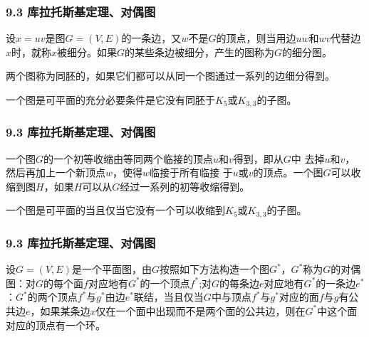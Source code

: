 \documentclass{beamer}
\begin{document}
\begin{CJK}{UTF8}{gbsn}
\begin{frame}
  \frametitle{9.3 库拉托斯基定理、对偶图}
  \begin{definition9.3.1}
    设$x=uv$是图$G=(V,E)$的一条边，又$w$不是$G$的顶点，则当用边$uw$和$wv$代替边$x$时，就称$x$被细分。如果$G$的某些条边被细分，产生的图称为$G$的细分图。
  \end{definition9.3.1}
  \begin{definition9.3.2}
    两个图称为同胚的，如果它们都可以从同一个图通过一系列的边细分得到。
  \end{definition9.3.2}
  \begin{theorem9.3.1}
    一个图是可平面的充分必要条件是它没有同胚于$K_5$或$K_{3,3}$的子图。
  \end{theorem9.3.1}
\end{frame}
\begin{frame}
  \frametitle{9.3 库拉托斯基定理、对偶图}
  \begin{definition9.3.3}
    一个图$G$的一个初等收缩由等同两个临接的顶点$u$和$v$得到，即从$G$中
    去掉$u$和$v$，然后再加上一个新顶点$w$，使得$w$临接于所有临接
    于$u$或$v$的顶点。一个图$G$可以收缩到图$H$，如果$H$可以从$G$经过一系列的初等收缩得到。
  \end{definition9.3.3}
  \begin{theorem9.3.2}
    一个图是可平面的当且仅当它没有一个可以收缩到$K_5$或$K_{3,3}$的子图。
  \end{theorem9.3.2}
\end{frame}
\begin{frame}
  \frametitle{9.3 库拉托斯基定理、对偶图}
  \begin{definition9.3.4}
    设$G=(V,E)$是一个平面图，由$G$按照如下方法构造一个图$G^*$，$G^*$称为$G$的对偶图：对$G$的每个面$f$对应地有$G^*$的一个顶点$f^*$;对$G$的每条边$e$对应地有$G^*$的一条边$e^*$：$G^*$的两个顶点$f^*$与$g^*$由边$e^*$联结，当且仅当$G$中与顶点$f^*$与$g^*$对应的面$f$与$g$有公共边$e$，如果某条边$x$仅在一个面中出现而不是两个面的公共边，则在$G^*$中这个面对应的顶点有一个环。
  \end{definition9.3.4}
\end{frame}


\end{CJK}
\end{document}
